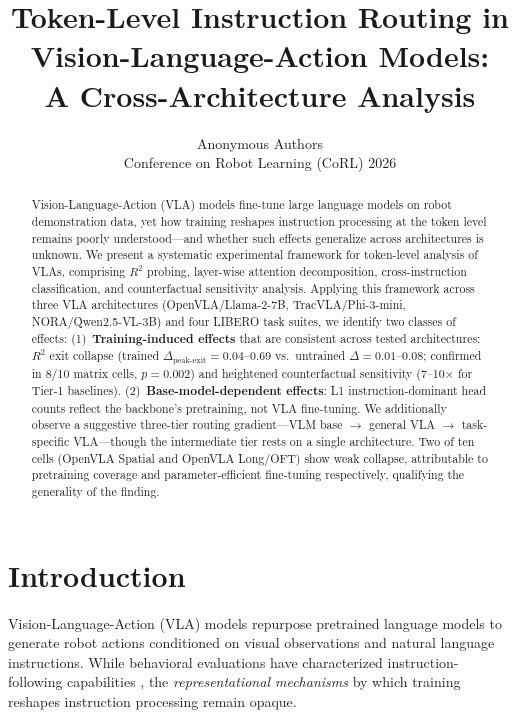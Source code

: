 \documentclass[10pt,twocolumn]{article}
\title{Token-Level Instruction Routing in Vision-Language-Action Models:\\A Cross-Architecture Analysis}
\author{
  Anonymous Authors\\
  Conference on Robot Learning (CoRL) 2026
}
\date{}
\begin{document}
\maketitle

\begin{abstract}
Vision-Language-Action (VLA) models fine-tune large language models on robot demonstration data, yet how training reshapes instruction processing at the token level remains poorly understood---and whether such effects generalize across architectures is unknown.
We present a systematic experimental framework for token-level analysis of VLAs, comprising $R^2$ probing, layer-wise attention decomposition, cross-instruction classification, and counterfactual sensitivity analysis.
Applying this framework across three VLA architectures (OpenVLA/Llama-2-7B, TracVLA/Phi-3-mini, NORA/Qwen2.5-VL-3B) and four LIBERO task suites, we identify two classes of effects:
(1)~\textbf{Training-induced effects} that are consistent across tested architectures: $R^2$ exit collapse (trained $\Delta_{\text{peak-exit}}=0.04$--$0.69$ vs.\ untrained $\Delta=0.01$--$0.08$; confirmed in 8/10 matrix cells, $p=0.002$) and heightened counterfactual sensitivity (7--10$\times$ for Tier-1 baselines).
(2)~\textbf{Base-model-dependent effects}: L1 instruction-dominant head counts reflect the backbone's pretraining, not VLA fine-tuning.
We additionally observe a suggestive three-tier routing gradient---VLM base $\to$ general VLA $\to$ task-specific VLA---though the intermediate tier rests on a single architecture.
Two of ten cells (OpenVLA Spatial and OpenVLA Long/OFT) show weak collapse, attributable to pretraining coverage and parameter-efficient fine-tuning respectively, qualifying the generality of the finding.
\end{abstract}

\section{Introduction}
\label{sec:intro}

Vision-Language-Action (VLA) models \cite{rt2,openvla} repurpose pretrained language models to generate robot actions conditioned on visual observations and natural language instructions. While behavioral evaluations have characterized instruction-following capabilities \cite{grant2026,haon2025}, the \emph{representational mechanisms} by which training reshapes instruction processing remain opaque.
\end{document}
